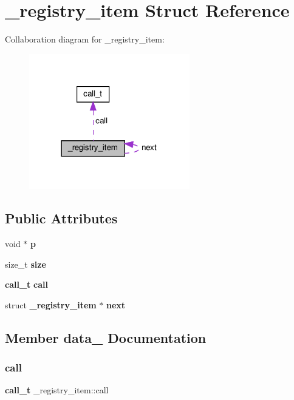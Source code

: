 \section{\+\_\+registry\+\_\+item Struct Reference}
\label{struct__registry__item}


Collaboration diagram for \+\_\+registry\+\_\+item\+:
\nopagebreak
\begin{figure}[H]
\begin{center}
\leavevmode
\includegraphics[width=198pt]{struct__registry__item__coll__graph}
\end{center}
\end{figure}
\subsection*{Public Attributes}
\begin{DoxyCompactItemize}
\item 
void $\ast$ \textbf{ p}
\item 
size\+\_\+t \textbf{ size}
\item 
\textbf{ call\+\_\+t} \textbf{ call}
\item 
struct \textbf{ \+\_\+registry\+\_\+item} $\ast$ \textbf{ next}
\end{DoxyCompactItemize}


\subsection{Member data_ Documentation}
\mbox{\label{struct__registry__item_ae5167771e18dc20df38808a4dafa761f}} 
\subsubsection{call}
{\footnotesize\ttfamily \textbf{ call\+\_\+t} \+\_\+registry\+\_\+item\+::call}

